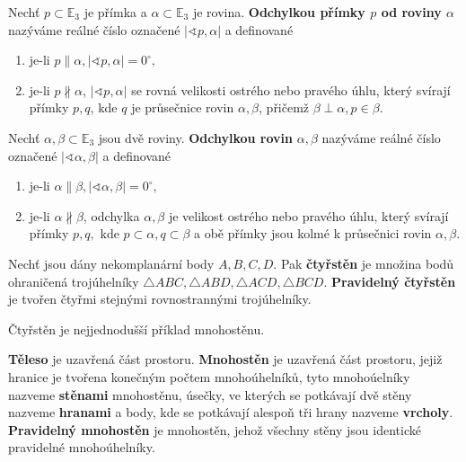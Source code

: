 \begin{definition}
    Nechť $p \subset \mathbb E_3$ je přímka a $\alpha \subset \mathbb E_3$ je
    rovina. \textbf{Odchylkou přímky $p$ od roviny $\alpha$} nazýváme
    reálné číslo označené $|\sphericalangle
    p,\alpha|$ a definované
    \begin{enumerate}[$i.$]
    \item je-li $p\parallel \alpha, |\sphericalangle p,\alpha|=0^\circ,$
    \item je-li $p\nparallel \alpha$, $|\sphericalangle p,\alpha|$ se rovná velikosti ostrého nebo
        pravého úhlu,
        který svírají přímky $p,q$, kde $q$ je průsečnice rovin $\alpha, \beta$,
        přičemž $\beta \perp \alpha, p\in\beta.$
    \end{enumerate}
\end{definition}

\begin{definition}
    Nechť $\alpha,\beta \subset \mathbb E_3$ jsou dvě roviny. \textbf{Odchylkou
    rovin} $\alpha, \beta$ nazýváme reálné číslo označené $|\sphericalangle
    \alpha, \beta|$ a definované
    \begin{enumerate}[$i.$]
    \item je-li $\alpha\parallel \beta, |\sphericalangle \alpha,\beta|=0^\circ,$
   	\item je-li $\alpha \nparallel \beta$, odchylka $\alpha,\beta$ je velikost
        ostrého nebo pravého úhlu,
        který svírají přímky $p,q,$ kde $p \subset \alpha, q \subset \beta$ a obě
        přímky jsou kolmé k průsečnici rovin $\alpha, \beta.$
    \end{enumerate}
\end{definition}

\begin{definition}
    Nechť jsou dány nekomplanární body $A,B,C,D.$ Pak
  \textbf{čtyřstěn} je množina bodů ohraničená trojúhelníky $\triangle ABC, \triangle
  ABD, \triangle ACD, \triangle BCD.$
  \textbf{Pravidelný čtyřstěn} je tvořen čtyřmi stejnými rovnostrannými trojúhelníky.
\end{definition}

\begin{pozn}
	Čtyřstěn je nejjednodušší příklad mnohostěnu.
\end{pozn}

\begin{definition}
\textbf{Těleso} je uzavřená část prostoru. \textbf{Mnohostěn} je uzavřená část prostoru, jejiž hranice je tvořena konečným počtem
mnohoúhelníků, tyto mnohoúelníky nazveme \textbf{stěnami} mnohostěnu, úsečky, ve kterých se potkávají dvě stěny nazveme \textbf{hranami} a body, kde se potkávají alespoň tři hrany nazveme \textbf{vrcholy}. \textbf{Pravidelný mnohostěn} je mnohostěn, jehož všechny stěny jsou identické pravidelné mnohoúhelníky.
\end{definition}


